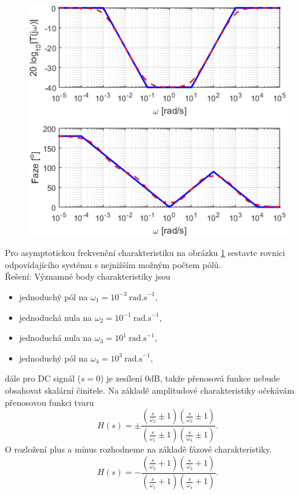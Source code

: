 \documentclass[twoside]{article}
\begin{document}
\subsection{~}
\begin{figure}
	\includegraphics{zadani4-2.png}
	\label{fig:zadani4}
\end{figure}
Pro asymptotickou frekvenční charakteristiku na obrázku \ref{fig:zadani4} sestavte rovnici odpovídajícího systému
s nejnižším možným počtem pólů. \\
Řešení: Významné body charakteristiky jsou
\begin{itemize}
	\item jednoduchý pól na $\omega_1 = 10^{-3}~\text{rad.s}^{-1}$,
	\item jednoduchá nula na $\omega_2 = 10^{-1}~\text{rad.s}^{-1}$,
	\item jednoduchá nula na $\omega_3 = 10^1~\text{rad.s}^{-1}$,
	\item jednoduchý pól na $\omega_4 = 10^3~\text{rad.s}^{-1}$,
\end{itemize}
dále pro DC signál ($s = 0$) je zesílení 0dB, takže přenosová funkce nebude obsahovat skalární činitele.
Na základě amplitudové charakteristiky očekávám přenosovou funkci tvaru
\begin{equation*}
	H(s) = \pm \frac{(\frac{s}{\omega_2}\pm 1)(\frac{s}{\omega_3} \pm 1)}{(\frac{s}{\omega_1}\pm 1)(\frac{s}{\omega_4} \pm 1)}.
\end{equation*}
O rozložení plus a mínus rozhodneme na základě fázové charakteristiky.
\begin{equation*}
	H(s) = - \frac{(\frac{s}{\omega_2} + 1)(\frac{s}{\omega_3} + 1)}{(\frac{s}{\omega_1} + 1)(\frac{s}{\omega_4} + 1)}.
\end{equation*}
\end{document}
